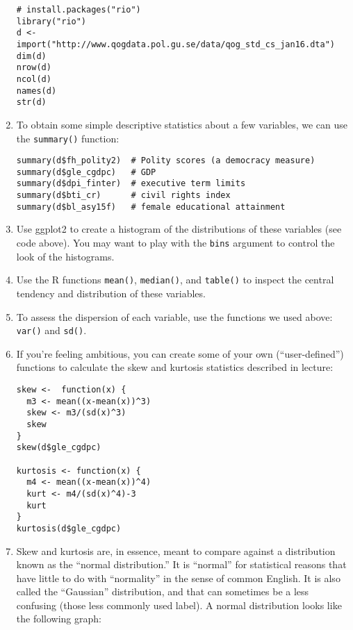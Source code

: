 \documentclass[a4paper,12pt]{article}
\begin{document}
\begin{enumerate}
\begin{verbatim}
# install.packages("rio")
library("rio")
d <- import("http://www.qogdata.pol.gu.se/data/qog_std_cs_jan16.dta")
dim(d)
nrow(d)
ncol(d)
names(d)
str(d)
\end{verbatim}

\item To obtain some simple descriptive statistics about a few variables, we can use the \texttt{summary()} function:

\begin{verbatim}
summary(d$fh_polity2)  # Polity scores (a democracy measure)
summary(d$gle_cgdpc)   # GDP
summary(d$dpi_finter)  # executive term limits
summary(d$bti_cr)      # civil rights index
summary(d$bl_asy15f)   # female educational attainment
\end{verbatim}

\item Use ggplot2 to create a histogram of the distributions of these variables (see code above). You may want to play with the \texttt{bins} argument to control the look of the histograms.

\item Use the R functions \texttt{mean()}, \texttt{median()}, and \texttt{table()} to inspect the central tendency and distribution of these variables.

\item To assess the dispersion of each variable, use the functions we used above: \texttt{var()} and \texttt{sd()}.

\item If you're feeling ambitious, you can create some of your own (``user-defined'') functions to calculate the skew and kurtosis statistics described in lecture:

\begin{verbatim}
skew <-  function(x) {
  m3 <- mean((x-mean(x))^3)
  skew <- m3/(sd(x)^3)
  skew
}
skew(d$gle_cgdpc)

kurtosis <- function(x) {  
  m4 <- mean((x-mean(x))^4) 
  kurt <- m4/(sd(x)^4)-3  
  kurt
}
kurtosis(d$gle_cgdpc)
\end{verbatim}

\item Skew and kurtosis are, in essence, meant to compare against a distribution known as the ``normal distribution.'' It is ``normal'' for statistical reasons that have little to do with ``normality'' in the sense of common English. It is also called the ``Gaussian'' distribution, and that can sometimes be a less confusing (those less commonly used label). A normal distribution looks like the following graph:


\end{enumerate}
\end{document}
